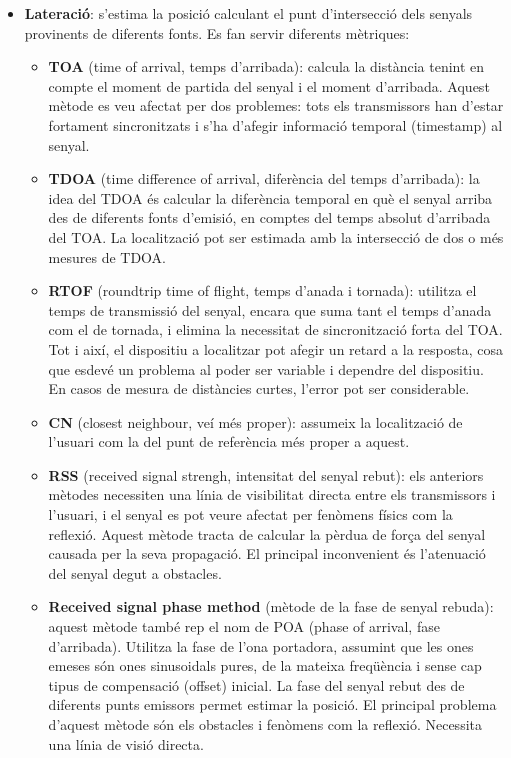 \begin{itemize}

    \item \textbf{Lateració}: s'estima la posició calculant el punt d’intersecció dels senyals provinents de diferents fonts. Es fan servir diferents mètriques:

    \begin{itemize}
        \item \textbf{TOA} (time of arrival, temps d'arribada): calcula la distància tenint en compte el moment de partida del senyal i el moment d'arribada. Aquest mètode es veu afectat per dos problemes: tots els transmissors han d'estar fortament sincronitzats i s'ha d'afegir informació temporal (timestamp) al senyal.
        \item \textbf{TDOA} (time difference of arrival, diferència del temps d'arribada): la idea del TDOA és calcular la diferència temporal en què el senyal arriba des de diferents fonts d’emisió, en comptes del temps absolut d'arribada del TOA. La localització pot ser estimada amb la intersecció de dos o més mesures de TDOA.
        \item \textbf{RTOF} (roundtrip time of flight, temps d'anada i tornada): utilitza el temps de transmissió del senyal, encara que suma tant el temps d'anada com el de tornada, i elimina la necessitat de sincronització forta del TOA. Tot i així, el dispositiu a localitzar pot afegir un retard a la resposta, cosa que esdevé un problema al poder ser variable i dependre del dispositiu. En casos de mesura de distàncies curtes, l'error pot ser considerable.
        \item \textbf{CN} (closest neighbour, veí més proper): assumeix la localització de l’usuari com la del punt de referència més proper a aquest.
        \item \textbf{RSS} (received signal strengh, intensitat del senyal rebut): els anteriors mètodes necessiten una línia de visibilitat directa entre els transmissors i l'usuari, i el senyal es pot veure afectat per fenòmens físics com la reflexió. Aquest mètode tracta de calcular la pèrdua de força del senyal causada per la seva propagació. El principal inconvenient és l'atenuació del senyal degut a obstacles.
        \item \textbf{Received signal phase method} (mètode de la fase de senyal rebuda): aquest mètode també rep el nom de POA (phase of arrival, fase d'arribada). Utilitza la fase de l'ona portadora, assumint que les ones emeses són ones sinusoidals pures, de la mateixa freqüència i sense cap tipus de compensació (offset) inicial. La fase del senyal rebut des de diferents punts emissors permet estimar la posició. El principal problema d'aquest mètode són els obstacles i fenòmens com la reflexió. Necessita una línia de visió directa.


\end{itemize}
\end{itemize}
